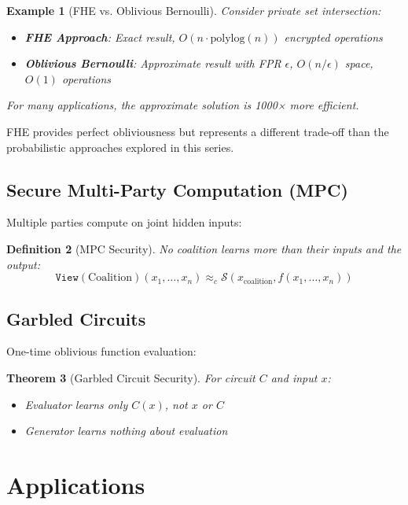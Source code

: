 \documentclass[11pt,final,hidelinks]{article}
\newtheorem{theorem}{Theorem}[section]
\newtheorem{definition}[theorem]{Definition}
\newtheorem{example}[theorem]{Example}
\newcommand{\Simulator}{\mathcal{S}}
\newcommand{\View}[1]{\mathtt{View}(#1)}
\begin{document}
\begin{example}[FHE vs. Oblivious Bernoulli]
Consider private set intersection:
\begin{itemize}
    \item \textbf{FHE Approach}: Exact result, $O(n \cdot \text{polylog}(n))$ encrypted operations
    \item \textbf{Oblivious Bernoulli}: Approximate result with FPR $\epsilon$, $O(n/\epsilon)$ space, $O(1)$ operations
\end{itemize}
For many applications, the approximate solution is 1000× more efficient.
\end{example}

FHE provides perfect obliviousness but represents a different trade-off than the probabilistic approaches explored in this series.

\subsection{Secure Multi-Party Computation (MPC)}

Multiple parties compute on joint hidden inputs:

\begin{definition}[MPC Security]
No coalition learns more than their inputs and the output:
\begin{equation}
\View{\text{Coalition}}(x_1, \ldots, x_n) \approx_c \Simulator(x_{\text{coalition}}, f(x_1, \ldots, x_n))
\end{equation}
\end{definition}

\subsection{Garbled Circuits}

One-time oblivious function evaluation:

\begin{theorem}[Garbled Circuit Security]
For circuit $C$ and input $x$:
\begin{itemize}
    \item Evaluator learns only $C(x)$, not $x$ or $C$
    \item Generator learns nothing about evaluation
\end{itemize}
\end{theorem}

\section{Applications}
\end{document}
